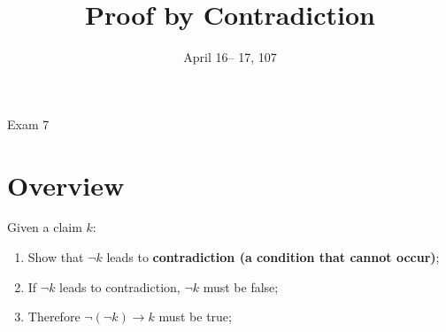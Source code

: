 \documentclass{note}
\date{April 16-- 17, 107}
\title{Proof by Contradiction}
\begin{document}
\begin{note}{Exam 7}

\section{Overview}

Given a claim $ k $:
\begin{enumerate}
    \item Show that $ \neg k $ leads to \textbf{contradiction (a condition that cannot occur)};
    \item If $ \neg k $ leads to contradiction, $ \neg k $ must be false;
    \item Therefore $ \neg \left( \neg k \right) \to k $ must be true;
\end{enumerate}

\end{note}
\end{document}
